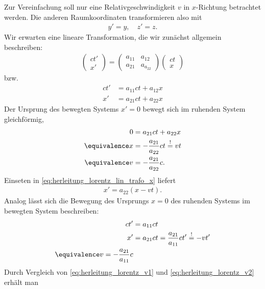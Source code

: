 Zur Vereinfachung soll nur eine Relativgeschwindigkeit $v$ in $x$-Richtung betrachtet werden.
Die anderen Raumkoordinaten transformieren also mit
\begin{align*}
    y'=y, \quad z'=z.
\end{align*}
Wir erwarten eine lineare Transformation, die wir zunächst allgemein beschreiben:
\begin{align}
    \label{eq:herleitung_lorentz_lin_trafo}
    \begin{pmatrix} ct' \\ x' \end{pmatrix} = \begin{pmatrix} a_{11} & a_{12} \\ a_{21} & a_{a_22} \end{pmatrix} \begin{pmatrix} ct \\ x \end{pmatrix}
\end{align}
bzw.
\begin{align}
    \label{eq:herleitung_lorentz_lin_trafo_ct}
    ct' & = a_{11} ct + a_{12}x \\
    \label{eq:herleitung_lorentz_lin_trafo_x}
    x'  & = a_{21} ct + a_{22}x
\end{align}
Der Ursprung des bewegten Systems $x'=0$ bewegt sich im ruhenden System gleichförmig,
\begin{align}
    0 & = a_{21} ct + a_{22}x \nonumber  \\ 
    \equivalence x &= -\frac{a_{21}}{a_{22}}ct \overset{!}{=}vt \nonumber  \\ 
    \label{eq:herleitung_lorentz_v1}
    \equivalence v &= -\frac{a_{21}}{a_{22}} c.
\end{align}
Einseten in \eqref{eq:herleitung_lorentz_lin_trafo_x} liefert
\begin{align}
    \label{eq:herleitung_lorentz_xprime}
    x'=a_{22} (x-vt).
\end{align}
Analog lässt sich die Bewegung des Ursprungs $x=0$ des ruhenden Systems im bewegten System beschreiben:
\begin{align}
    ct' & = a_{11}ct \nonumber                                                \\
    x'  & = a_{21}ct = \frac{a_{21}}{a_{11}}ct' \overset{!}{=} -vt' \nonumber \\
    \label{eq:herleitung_lorentz_v2}
    \equivalence v=-\frac{a_{21}}{a_{11}}c
\end{align}
Durch Vergleich von \eqref{eq:herleitung_lorentz_v1} und \eqref{eq:herleitung_lorentz_v2} erhält man 
